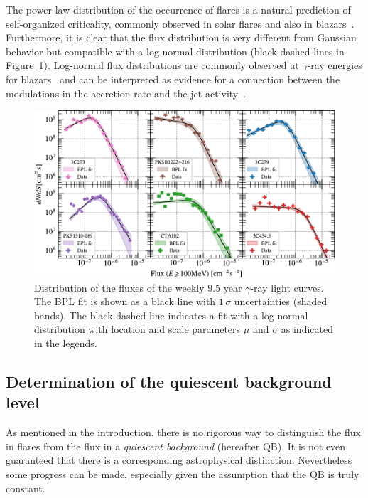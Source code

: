 \documentclass[twocolumn,linenumbers]{aastex62}
\newcommand{\gray}{$\gamma$-ray\xspace}
\begin{document}
The power-law distribution of the occurrence of flares is a natural prediction of self-organized criticality, commonly observed in solar flares and also in blazars~\citep[see, e.g.,][and references therein]{2016SSRv..198...47A}.    
Furthermore, it is clear that the flux distribution is very different from Gaussian behavior but
compatible with a log-normal distribution (black dashed lines in Figure~\ref{fig:fluxpdf}). 
Log-normal flux distributions are commonly observed at \gray energies for blazars~\citep[e.g.,][]{2010A&A...524A..48T,2015ApJ...810...14A,2018arXiv180504675S}
and can be interpreted as evidence for a connection between the  
modulations in the accretion rate and the jet activity~\citep{2009A&A...503..797G}.


\begin{figure}
    \includegraphics[width = .99\linewidth]{fluxdist_weekly_tsmin9.pdf}
    \caption{\label{fig:fluxpdf} Distribution of the fluxes of the weekly 9.5 year \gray light curves. The BPL fit is shown as a black line with $1\,\sigma$ uncertainties (shaded bands). The black dashed line indicates a fit with a log-normal distribution with location and scale parameters $\mu$ and $\sigma$ as indicated in the legends.}
\end{figure}

\subsection{Determination of the quiescent background level}
\label{sec:qb}
As mentioned in the introduction, 
there is no rigorous way to distinguish the 
flux in flares from the flux 
in a {\em quiescent background} (hereafter QB).
It is not even guaranteed that
there is a corresponding astrophysical distinction.
Nevertheless some progress can be made,
especially given the assumption that the QB is
truly constant.
\end{document}
